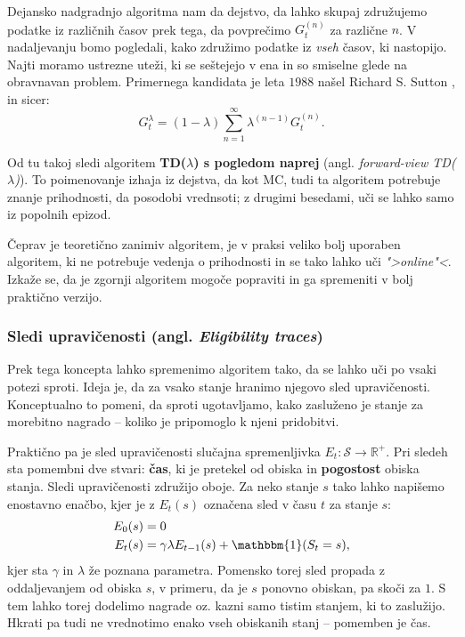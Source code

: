 \documentclass[12pt,a4paper]{amsart}
\theoremstyle{definition} %
\theoremstyle{plain} %
\begin{document}
Dejansko nadgradnjo algoritma nam da dejstvo, da lahko skupaj združujemo podatke iz različnih časov 
prek tega, da povprečimo $G_t^{(n)}$ za različne $n$. V nadaljevanju bomo pogledali, kako združimo 
podatke iz \textit{vseh} časov, ki nastopijo. Najti moramo ustrezne uteži, ki se seštejejo v ena in so 
smiselne glede na obravnavan problem. Primernega kandidata je leta $1988$ našel Richard S. Sutton
\cite{TDlambda}, in sicer:
$$
G_t^\lambda = (1 - \lambda) \sum_{n=1}^\infty \lambda^{(n-1)} G_t^{(n)}.
$$

Od tu takoj sledi algoritem \textbf{TD($\lambda$) s pogledom naprej} (angl. \textit{forward-view 
TD($\lambda$)}). To poimenovanje izhaja iz dejstva, da kot MC, tudi ta algoritem potrebuje znanje
prihodnosti, da posodobi vrednsoti; z drugimi besedami, uči se lahko samo iz popolnih epizod.

Čeprav je teoretično zanimiv algoritem, je v praksi veliko bolj uporaben algoritem, ki ne potrebuje
vedenja o prihodnosti in se tako lahko uči \textit{">online"<}. Izkaže se, da je zgornji algoritem 
mogoče popraviti in ga spremeniti v bolj praktično verzijo.

\subsubsection{Sledi upravičenosti (angl. \textit{Eligibility traces})}
Prek tega koncepta lahko spremenimo algoritem tako, da se lahko uči po vsaki potezi sproti. Ideja 
je, da za vsako stanje hranimo njegovo sled upravičenosti. Konceptualno to pomeni, da sproti 
ugotavljamo, kako zasluženo je stanje za morebitno nagrado -- koliko je pripomoglo k njeni 
pridobitvi.

Praktično pa je sled upravičenosti slučajna spremenljivka $E_t: \mathcal{S} \rightarrow \mathbb{R}^+$. 
Pri sledeh sta pomembni dve stvari: \textbf{čas}, ki je pretekel od obiska in \textbf{pogostost} 
obiska stanja. Sledi upravičenosti združijo oboje. Za neko stanje $s$ tako lahko napišemo enostavno 
enačbo, kjer je z $E_t(s)$ označena sled v času $t$ za stanje $s$:
\begin{align*}
    E_0(s) &= 0 \\
    E_t(s) &= \gamma \lambda E_{t-1}(s) + \mathbbm{1}(S_t = s),
\end{align*}
kjer sta $\gamma$ in $\lambda$ že poznana parametra. Pomensko torej sled propada z oddaljevanjem 
od obiska $s$, v primeru, da je $s$ ponovno obiskan, pa skoči za $1$. S tem lahko torej dodelimo 
nagrade oz. kazni samo tistim stanjem, ki to zaslužijo. Hkrati pa tudi ne vrednotimo enako vseh 
obiskanih stanj -- pomemben je čas.
\end{document}
